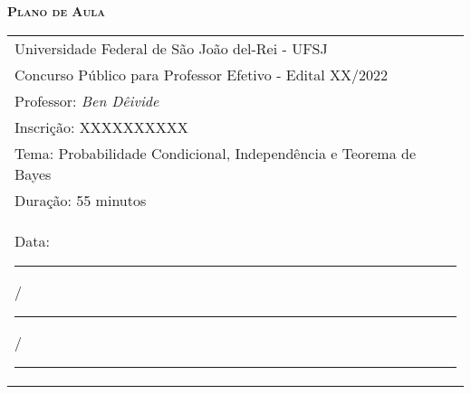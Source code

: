 \documentclass[landscape,a4paper]{article}
\begin{document}
	\begin{center}
		\bf \textsc{\LARGE Plano de Aula}\\ %
	\end{center}
	
	\begin{tabular}{l}
		Universidade Federal de São João del-Rei - UFSJ\\
		Concurso Público para Professor Efetivo - Edital XX/2022\\
		Professor: \emph{Ben Dêivide}\\
		Inscrição: XXXXXXXXXX\\
		Tema: Probabilidade Condicional, Independência e Teorema de Bayes\\
		Duração: 55 minutos\\
		Data: \rule{.5cm}{.1mm}/\rule{.5cm}{.1mm}/\rule{.5cm}{.1mm}
	\end{tabular}
	
\end{document}
